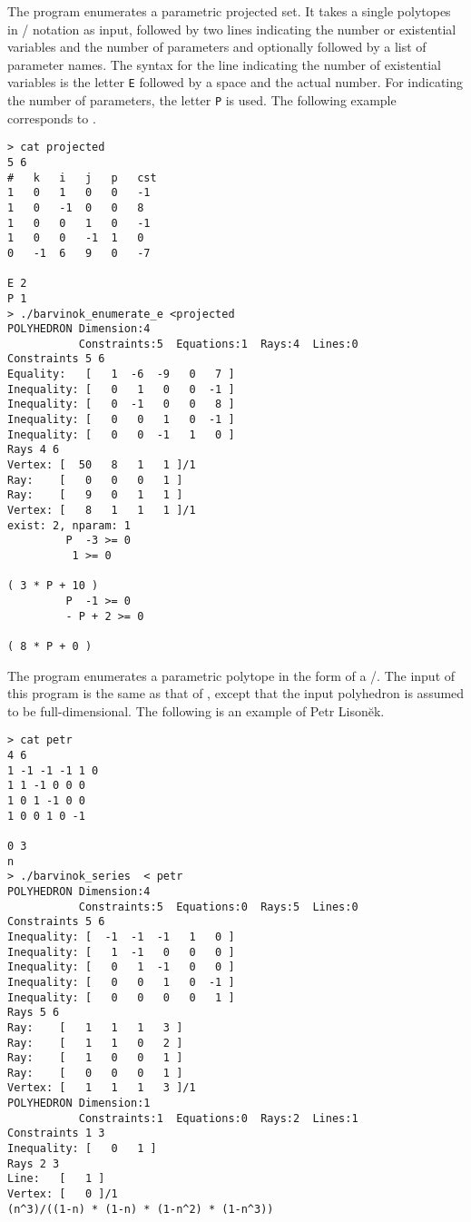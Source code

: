The program  enumerates a
parametric projected set.  It takes a single polytopes in \PolyLib/
notation as input, followed by two lines indicating the number
or existential variables and the number of parameters and
optionally followed by a list of parameter names.
The syntax for the line indicating the number of existential
variables is the letter \verb+E+ followed by a space and the actual number.
For indicating the number of parameters, the letter \verb+P+ is used.
The following example corresponds to 
.
\begin{verbatim}
> cat projected 
5 6
#   k   i   j   p   cst
1   0   1   0   0   -1
1   0   -1  0   0   8
1   0   0   1   0   -1
1   0   0   -1  1   0
0   -1  6   9   0   -7

E 2
P 1
> ./barvinok_enumerate_e <projected 
POLYHEDRON Dimension:4
           Constraints:5  Equations:1  Rays:4  Lines:0
Constraints 5 6
Equality:   [   1  -6  -9   0   7 ]
Inequality: [   0   1   0   0  -1 ]
Inequality: [   0  -1   0   0   8 ]
Inequality: [   0   0   1   0  -1 ]
Inequality: [   0   0  -1   1   0 ]
Rays 4 6
Vertex: [  50   8   1   1 ]/1
Ray:    [   0   0   0   1 ]
Ray:    [   9   0   1   1 ]
Vertex: [   8   1   1   1 ]/1
exist: 2, nparam: 1
         P  -3 >= 0
          1 >= 0

( 3 * P + 10 )
         P  -1 >= 0
         - P + 2 >= 0

( 8 * P + 0 )
\end{verbatim}

The program  enumerates a
parametric polytope in the form of a \rgf/.  
The input of this program is the same as that of
, except that the input polyhedron
is assumed to be full-dimensional.
The following is an example of Petr Lison\u{e}k.
\begin{verbatim}
> cat petr
4 6
1 -1 -1 -1 1 0
1 1 -1 0 0 0
1 0 1 -1 0 0
1 0 0 1 0 -1

0 3
n
> ./barvinok_series  < petr
POLYHEDRON Dimension:4
           Constraints:5  Equations:0  Rays:5  Lines:0
Constraints 5 6
Inequality: [  -1  -1  -1   1   0 ]
Inequality: [   1  -1   0   0   0 ]
Inequality: [   0   1  -1   0   0 ]
Inequality: [   0   0   1   0  -1 ]
Inequality: [   0   0   0   0   1 ]
Rays 5 6
Ray:    [   1   1   1   3 ]
Ray:    [   1   1   0   2 ]
Ray:    [   1   0   0   1 ]
Ray:    [   0   0   0   1 ]
Vertex: [   1   1   1   3 ]/1
POLYHEDRON Dimension:1
           Constraints:1  Equations:0  Rays:2  Lines:1
Constraints 1 3
Inequality: [   0   1 ]
Rays 2 3
Line:   [   1 ]
Vertex: [   0 ]/1
(n^3)/((1-n) * (1-n) * (1-n^2) * (1-n^3))
\end{verbatim}
